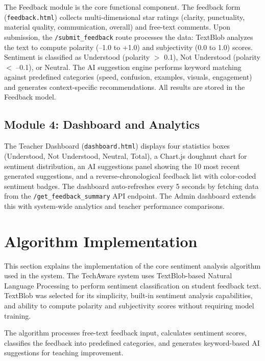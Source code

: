 The Feedback module is the core functional component. The feedback form (\texttt{feedback.html}) collects multi-dimensional star ratings (clarity, punctuality, material quality, communication, overall) and free-text comments. Upon submission, the \texttt{/submit\_feedback} route processes the data: TextBlob analyzes the text to compute polarity (--1.0 to +1.0) and subjectivity (0.0 to 1.0) scores. Sentiment is classified as Understood (polarity $>$ 0.1), Not Understood (polarity $<$ --0.1), or Neutral. The AI suggestion engine performs keyword matching against predefined categories (speed, confusion, examples, visuals, engagement) and generates context-specific recommendations. All results are stored in the Feedback model.

\subsection{Module 4: Dashboard and Analytics}

The Teacher Dashboard (\texttt{dashboard.html}) displays four statistics boxes (Understood, Not Understood, Neutral, Total), a Chart.js doughnut chart for sentiment distribution, an AI suggestions panel showing the 10 most recent generated suggestions, and a reverse-chronological feedback list with color-coded sentiment badges. The dashboard auto-refreshes every 5 seconds by fetching data from the \texttt{/get\_feedback\_summary} API endpoint. The Admin dashboard extends this with system-wide analytics and teacher performance comparisons.


\section{Algorithm Implementation}

This section explains the implementation of the core sentiment analysis algorithm used in the system. 
The TechAware system uses TextBlob-based Natural Language Processing to perform sentiment classification on student feedback text. TextBlob was selected for its simplicity, built-in sentiment analysis capabilities, and ability to compute polarity and subjectivity scores without requiring model training.

The algorithm processes free-text feedback input, calculates sentiment scores, classifies the feedback into predefined categories, and generates keyword-based AI suggestions for teaching improvement.

